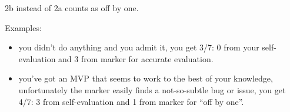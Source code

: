 \documentclass{article}
\begin{document}
\begin{Question}
\begin{Subquestion}
\begin{markingguide}
2b instead of 2a counts as off by one.

Examples:
\begin{itemize}
\item you didn't do anything and you admit it, you get 3/7: 0 from your self-evaluation and 3 from marker for accurate evaluation.
\item you've got an MVP that seems to work to the best of your knowledge, unfortunately the marker easily finds a not-so-subtle bug or issue, you get 4/7: 3 from self-evaluation and 1 from marker for ``off by one''.
\end{itemize}
\end{markingguide}
\end{Subquestion}
\end{Question}
\end{document}

